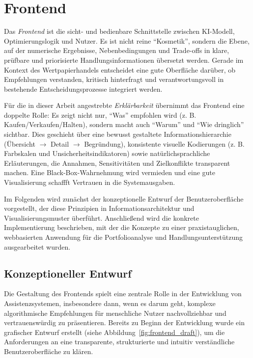   \section{Frontend}
  \label{sec:frontend}

    Das \textit{Frontend} ist die sicht- und bedienbare Schnittstelle zwischen \acs{KI}-Modell, Optimierungslogik und Nutzer.
    Es ist nicht reine \enquote{Kosmetik}, sondern die Ebene, auf der numerische Ergebnisse, Nebenbedingungen und Trade-offs in klare, prüfbare und priorisierte Handlungsinformationen übersetzt werden.
    Gerade im Kontext des Wertpapierhandels entscheidet eine gute Oberfläche darüber, ob Empfehlungen verstanden, kritisch hinterfragt und verantwortungsvoll in bestehende Entscheidungsprozesse integriert werden.

    Für die in dieser Arbeit angestrebte \textit{Erklärbarkeit} übernimmt das Frontend eine doppelte Rolle:
    Es zeigt nicht nur, \enquote{Was} empfohlen wird (z. B. Kaufen/Verkaufen/Halten), sondern macht auch \enquote{Warum} und \enquote{Wie dringlich} sichtbar.
    Dies geschieht über eine bewusst gestaltete Informationshierarchie (Übersicht $\rightarrow$ Detail $\rightarrow$ Begründung), konsistente visuelle Kodierungen (z. B. Farbskalen und Unsicherheitsindikatoren) sowie natürlichsprachliche Erläuterungen, die Annahmen, Sensitivitäten und Zielkonflikte transparent machen.
    Eine Black-Box-Wahrnehmung wird vermieden und eine gute Visualisierung schaffft Vertrauen in die Systemausgaben.

    Im Folgenden wird zunächst der konzeptionelle Entwurf der Benutzeroberfläche vorgestellt, der diese Prinzipien in Informationsarchitektur und Visualisierungsmuster überführt.
    Anschließend wird die konkrete Implementierung beschrieben, mit der die Konzepte zu einer praxistauglichen, webbasierten Anwendung für die Portfolioanalyse und Handlungsunterstützung ausgearbeitet wurden.

    \subsection{Konzeptioneller Entwurf}

      Die Gestaltung des Frontends spielt eine zentrale Rolle in der Entwicklung von Assistenzsystemen, insbesondere dann, wenn es darum geht, komplexe algorithmische Empfehlungen für menschliche Nutzer nachvollziehbar und vertrauenswürdig zu präsentieren.
      Bereits zu Beginn der Entwicklung wurde ein grafischer Entwurf erstellt (siehe Abbildung~\ref{fig:frontend_draft}), um die Anforderungen an eine transparente, strukturierte und intuitiv verständliche Benutzeroberfläche zu klären.

